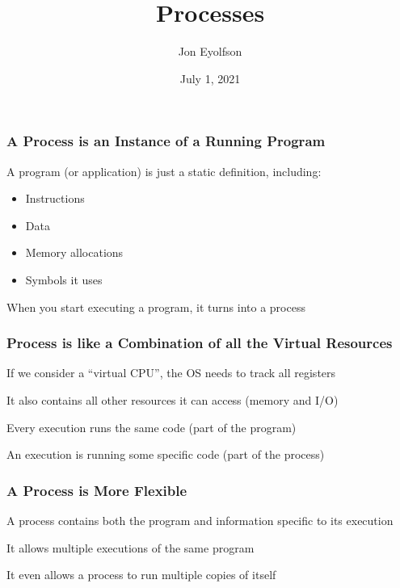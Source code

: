 

\title{Processes}
\author{Jon Eyolfson}
\date{July 1, 2021}


  \begin{frame}
    \titlepage
  \end{frame}

  \begin{frame}
    \frametitle{A Process is an Instance of a Running Program}

    A program (or application) is just a static definition, including:

    \begin{itemize}
      \item Instructions
      \item Data
      \item Memory allocations
      \item Symbols it uses
    \end{itemize}

    \vspace{2em}

    When you start executing a program, it turns into a process
  \end{frame}

  \begin{frame}
    \frametitle{Process is like a Combination of all the Virtual Resources}

    If we consider a ``virtual CPU'', the OS needs to track all registers

    \vspace{2em}

    It also contains all other resources it can access (memory and I/O)

    \vspace{4em}

    Every execution runs the same code (part of the program)

    \hspace{2em} An execution is running some specific code (part of the
                 process)
  \end{frame}

  \begin{frame}
    \frametitle{A Process is More Flexible}

    A process contains both the program and information specific
    to its execution

    \vspace{4em}

    It allows multiple executions of the same program

    \vspace{2em}

    It even allows a process to run multiple copies of itself
  \end{frame}

